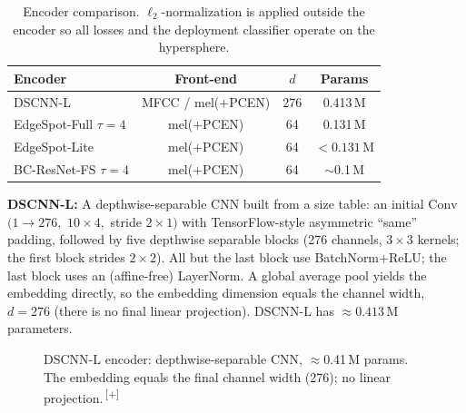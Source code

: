 \documentclass[12pt,a4paper]{report}
\newcommand{\NEW}[1]{{\color{addcolor}#1\,\textsuperscript{\tiny[+]}}}
\newcommand{\NEW}[1]{#1}
\begin{document}
\begin{table}[H]
\centering
\caption{Encoder comparison. $\ell_2$-normalization is applied outside the
encoder so all losses and the deployment classifier operate on the hypersphere.}
\label{tab:encoders}
\begin{tabular}{lccc}
\toprule
\textbf{Encoder} & \textbf{Front-end} & \textbf{$d$} & \textbf{Params} \\
\midrule
DSCNN-L              & MFCC / mel($+$PCEN) & 276 & 0.413\,M \\
EdgeSpot-Full $\tau{=}4$ & mel($+$PCEN)    & 64  & 0.131\,M \\
EdgeSpot-Lite       & mel($+$PCEN)        & 64  & $<0.131$\,M \\
BC-ResNet-FS $\tau{=}4$  & mel($+$PCEN)    & 64  & $\sim$0.1\,M \\
\bottomrule
\end{tabular}
\end{table}

\textbf{DSCNN-L:} A depthwise-separable CNN built from a size table: an initial
$\text{Conv}$ $(1{\to}276,$ $10{\times}4,$ stride $2{\times}1)$ with
TensorFlow-style asymmetric ``same'' padding, followed by five depthwise separable
blocks (276 channels, $3{\times}3$ kernels; the first block strides $2{\times}2$).
All but the last block use BatchNorm+ReLU; the last block uses an (affine-free)
LayerNorm. A global average pool yields the embedding directly, so the embedding
dimension equals the channel width, $d = 276$ (there is no final linear
projection). DSCNN-L has $\approx 0.413$\,M parameters.

\begin{figure}[H]
\centering
{}
\caption{\NEW{DSCNN-L encoder: depthwise-separable CNN, $\approx$0.41\,M params.
The embedding equals the final channel width (276); no linear projection.}}
\label{fig:dscnn}
\end{figure}
\end{document}
